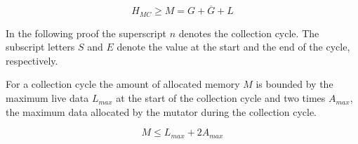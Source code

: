 \begin{equation}\label{equ:mcheapmin}
    H_{MC} \ge M = G + \overline{G} + L
\end{equation}


In the following proof the superscript $n$ denotes the collection
cycle. The subscript letters $S$ and $E$ denote the value at the
start and the end of the cycle, respectively.

\begin{lemma}

For a collection cycle the amount of allocated memory $M$ is bounded
by the maximum live data $L_{max}$ at the start of the collection
cycle and two times $A_{max}$, the maximum data allocated by the
mutator during the collection cycle.

\begin{equation}\label{equ:mc:lemma}
    M \le L_{max} + 2 A_{max}
\end{equation}

\end{lemma}

